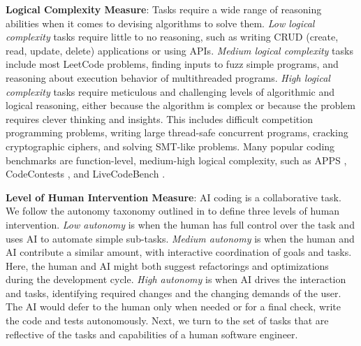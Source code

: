 \textbf{Logical Complexity Measure}: Tasks require a wide range of reasoning abilities when it comes to devising algorithms to solve them. \textit{Low logical complexity} tasks require little to no reasoning, such as writing CRUD (create, read, update, delete) applications or using APIs. \textit{Medium logical complexity} tasks include most LeetCode problems, finding inputs to fuzz simple programs, and reasoning about execution behavior of multithreaded programs. \textit{High logical complexity} tasks require meticulous and challenging levels of algorithmic and logical reasoning, either because the algorithm is complex or because the problem requires clever thinking and insights. This includes difficult competition programming problems, writing large thread-safe concurrent programs, cracking cryptographic ciphers, and solving SMT-like problems. Many popular coding benchmarks are function-level, medium-high logical complexity, such as APPS \citep{hendrycksapps2021}, CodeContests \citep{li2022competition}, and LiveCodeBench \citep{jain2024livecodebenchholisticcontaminationfree}. 

\textbf{Level of Human Intervention Measure}: AI coding is a collaborative task. We follow the autonomy taxonomy outlined in \citet{morris2023levels} to define three levels of human intervention. \textit{Low autonomy} is when the human has full control over the task and uses AI to automate simple sub-tasks. \textit{Medium autonomy} is when the human and AI contribute a similar amount, with interactive coordination of goals and tasks. Here, the human and AI might both suggest refactorings and optimizations during the development cycle. \textit{High autonomy} is when AI drives the interaction and tasks, identifying required changes and the changing demands of the user. The AI would defer to the human only when needed or for a final check, write the code and tests autonomously. Next, we turn to the set of tasks that are reflective of the tasks and capabilities of a human software engineer. 






